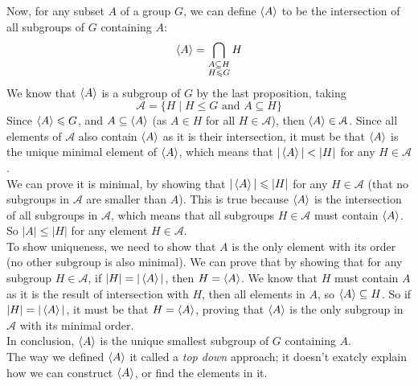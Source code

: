 \documentclass[12pt]{article}
\begin{document}
    Now, for any subset $A$ of a group $G$,
    we can define $\left\langle A \right\rangle$
    to be the intersection of all subgroups of $G$
    containing $A$:
    \[ \left\langle A \right\rangle = 
    \bigcap_{\substack{A \subseteq H \\ H \leqslant G}} H \]
    We know that $\left\langle A \right\rangle$ is a subgroup of $G$ by the last proposition,
    taking
    \[ \mathcal{A} = 
    \{ H \mid H \leqslant G \text{ and } A \subseteq H \} \]
    Since $\left\langle A \right\rangle \leqslant G$,
    and $A \subseteq \left\langle A \right\rangle$
    (as $A \in H$ for all $H \in \mathcal{A}$),
    then $\left\langle A \right\rangle \in \mathcal{A}$.
    Since all elements of $\mathcal{A}$ also contain $\left\langle A \right\rangle$
    as it is their intersection,
    it must be that $\left\langle A \right\rangle$
    is the unique minimal element of $\left\langle A \right\rangle$,
    which means that $|\left\langle A \right\rangle| < |H|$
    for any $H \in \mathcal{A}$. \\
    We can prove it is minimal,
    by showing that $|\left\langle A \right\rangle| \leqslant |H|$
    for any $H \in \mathcal{A}$
    (that no subgroups in $\mathcal{A}$ are smaller than $A$).
    This is true because $\left\langle A \right\rangle$
    is the intersection of all subgroups in $\mathcal{A}$,
    which means that all subgroups $H \in \mathcal{A}$
    must contain $\left\langle A \right\rangle$.
    So $|A| \leqslant |H|$ for any element $H \in \mathcal{A}$. \\ 
    To show uniqueness,
    we need to show that $A$ is the only element
    with its order
    (no other subgroup is also minimal).
    We can prove that by showing that for any subgroup
    $H \in \mathcal{A}$,
    if $|H| = |\left\langle A \right\rangle|$,
    then $H = \left\langle A \right\rangle$.
    We know that $H$ must contain $A$
    as it is the result of intersection with $H$,
    then all elements in $A$,
    so $\left\langle A \right\rangle \subseteq H$.
    So if $|H| = |\left\langle A \right\rangle|$,
    it must be that $H = \left\langle A \right\rangle$,
    proving that $\left\langle A \right\rangle$ is the only subgroup in $\mathcal{A}$
    with its minimal order. \\
    In conclusion,
    $\left\langle A \right\rangle$ is the unique smallest subgroup of $G$
    containing $A$. \\

    The way we defined $\left\langle A \right\rangle$
    it called a \textit{top down} approach;
    it doesn't exatcly explain how we can construct $\left\langle A \right\rangle$,
    or find the elements in it. \\
    
\end{document}
